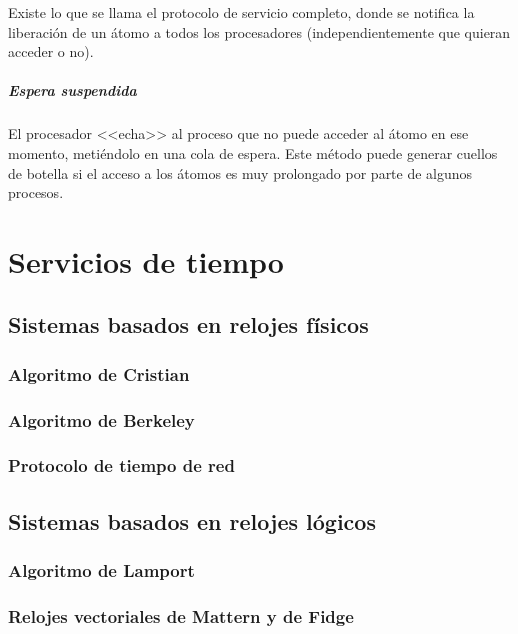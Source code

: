 \documentclass[a4paper, 11pt, titlepage]{article}
\begin{document}
                        Existe lo que se llama el protocolo de servicio completo, donde se notifica 
                        la liberación de un átomo a todos los procesadores (independientemente que 
                        quieran acceder o no).

                    \subparagraph{Espera suspendida}

                        El procesador <<echa>> al proceso que no puede acceder al átomo en ese momento, 
                        metiéndolo en una cola de espera. Este método puede generar cuellos de botella 
                        si el acceso a los átomos es muy prolongado por parte de algunos procesos.

\section{Servicios de tiempo}

    \subsection{Sistemas basados en relojes físicos}

        \subsubsection{Algoritmo de Cristian}

        \subsubsection{Algoritmo de Berkeley}

        \subsubsection{Protocolo de tiempo de red}

    \subsection{Sistemas basados en relojes lógicos}

        \subsubsection{Algoritmo de Lamport}

        \subsubsection{Relojes vectoriales de Mattern y de Fidge}
\end{document}
